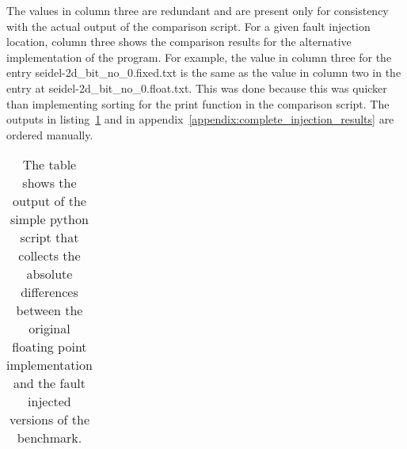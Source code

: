 The values in column three are redundant and are present only for consistency with the actual output of the comparison script. For a given fault injection location, column three shows the comparison results for the alternative implementation of the program. For example, the value in column three for the entry seidel-2d\_bit\_no\_0.fixed.txt is the same as the value in column two in the entry at seidel-2d\_bit\_no\_0.float.txt. This was done because this was quicker than implementing sorting for the print function in the comparison script. The outputs in listing~\ref{table:injection_results} and in appendix~\ref{appendix:complete_injection_results} are ordered manually.


\begin{table}
\caption{The table shows the output of the simple python script that collects the absolute differences between the original floating point implementation and the fault injected versions of the benchmark.}
\label{table:injection_results}
\begin{tabular}{lll}
   


\end{tabular}
\end{table}
